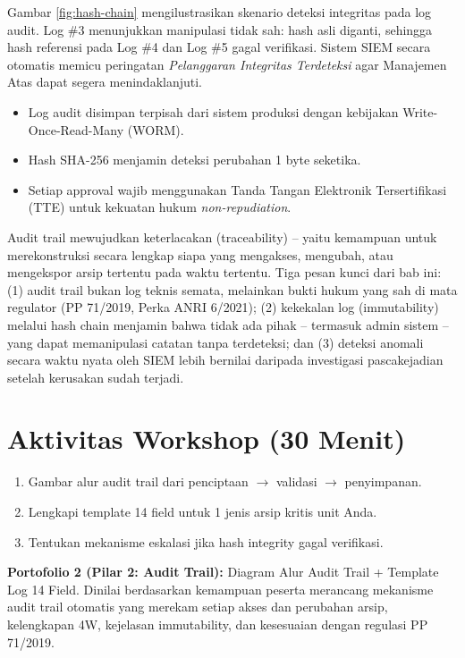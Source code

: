 \documentclass[12pt,a4paper]{report}
\begin{document}
\small Gambar \ref{fig:hash-chain} mengilustrasikan skenario deteksi integritas pada log audit. Log \#3 menunjukkan manipulasi tidak sah: hash asli diganti, sehingga hash referensi pada Log \#4 dan Log \#5 gagal verifikasi. Sistem SIEM secara otomatis memicu peringatan \textit{Pelanggaran Integritas Terdeteksi} agar Manajemen Atas dapat segera menindaklanjuti.

\begin{itemize}[leftmargin=*]
    \item Log audit disimpan terpisah dari sistem produksi dengan kebijakan Write-Once-Read-Many (WORM).
    \item Hash SHA-256 menjamin deteksi perubahan 1 byte seketika.
    \item Setiap approval wajib menggunakan Tanda Tangan Elektronik Tersertifikasi (TTE) untuk kekuatan hukum \textit{non-repudiation}.
\end{itemize}

\begin{plnbox}
Audit trail mewujudkan keterlacakan (traceability) -- yaitu kemampuan untuk merekonstruksi secara lengkap siapa yang mengakses, mengubah, atau mengekspor arsip tertentu pada waktu tertentu. Tiga pesan kunci dari bab ini: (1) audit trail bukan log teknis semata, melainkan bukti hukum yang sah di mata regulator (PP 71/2019, Perka ANRI 6/2021); (2) kekekalan log (immutability) melalui hash chain menjamin bahwa tidak ada pihak -- termasuk admin sistem -- yang dapat memanipulasi catatan tanpa terdeteksi; dan (3) deteksi anomali secara waktu nyata oleh SIEM lebih bernilai daripada investigasi pascakejadian setelah kerusakan sudah terjadi.
\end{plnbox}

\section{Aktivitas Workshop (30 Menit)}
\begin{enumerate}[leftmargin=*]
    \item Gambar alur audit trail dari penciptaan $\rightarrow$ validasi $\rightarrow$ penyimpanan.
    \item Lengkapi template 14 field untuk 1 jenis arsip kritis unit Anda.
    \item Tentukan mekanisme eskalasi jika hash integrity gagal verifikasi.
\end{enumerate}

\begin{outputbox}
\textbf{Portofolio 2 (Pilar 2: Audit Trail):} Diagram Alur Audit Trail + Template Log 14 Field. Dinilai berdasarkan kemampuan peserta merancang mekanisme audit trail otomatis yang merekam setiap akses dan perubahan arsip, kelengkapan 4W, kejelasan immutability, dan kesesuaian dengan regulasi PP 71/2019.
\end{outputbox}
\end{document}
